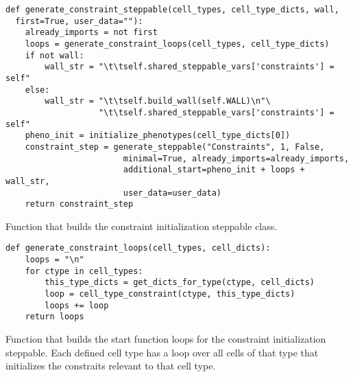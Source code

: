 
\begin{listing}[H]%
\begin{verbatim}
def generate_constraint_steppable(cell_types, cell_type_dicts, wall, 
  first=True, user_data=""):
    already_imports = not first
    loops = generate_constraint_loops(cell_types, cell_type_dicts)
    if not wall:
        wall_str = "\t\tself.shared_steppable_vars['constraints'] = self"
    else:
        wall_str = "\t\tself.build_wall(self.WALL)\n"\
                   "\t\tself.shared_steppable_vars['constraints'] = self"
    pheno_init = initialize_phenotypes(cell_type_dicts[0])
    constraint_step = generate_steppable("Constraints", 1, False, 
                        minimal=True, already_imports=already_imports,
                        additional_start=pheno_init + loops + wall_str, 
                        user_data=user_data)
    return constraint_step
\end{verbatim}
\caption{Function that builds the constraint initialization steppable class.}\label{code:trans:cc3d:constr-step:gen}
\end{listing}



\begin{listing}[H]%
\begin{verbatim}
def generate_constraint_loops(cell_types, cell_dicts):
    loops = "\n"
    for ctype in cell_types:
        this_type_dicts = get_dicts_for_type(ctype, cell_dicts)
        loop = cell_type_constraint(ctype, this_type_dicts)
        loops += loop
    return loops
\end{verbatim}
\caption{Function that builds the start function loops for the constraint initialization steppable. Each defined cell type has a loop over all cells of that type that initializes the constraits relevant to that cell type.}\label{code:trans:cc3d:constr-step:loops}
\end{listing}

